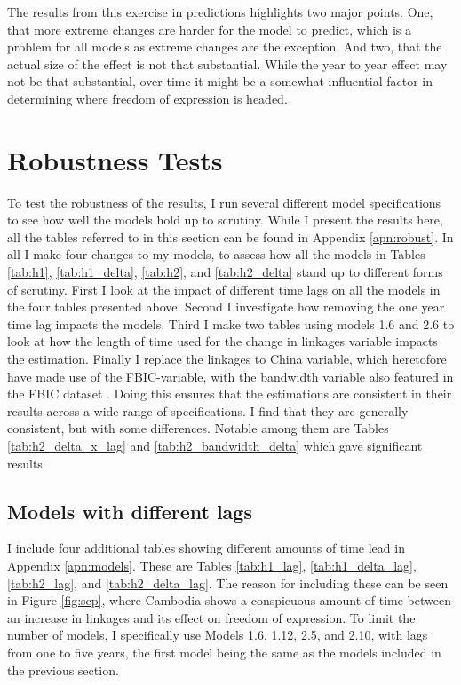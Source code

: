 The results from this exercise in predictions highlights two major points. One, that more extreme changes are harder for the model to predict, which is a problem for all models as extreme changes are the exception. And two, that the actual size of the effect is not that substantial. While the year to year effect may not be that substantial, over time it might be a somewhat influential factor in determining where freedom of expression is headed.

\section{Robustness Tests} \label{sec:robust}
To test the robustness of the results, I run several different model specifications to see how well the models hold up to scrutiny. While I present the results here, all the tables referred to in this section can be found in Appendix \ref{apn:robust}. In all I make four changes to my models, to assess how all the models in Tables \ref{tab:h1}, \ref{tab:h1_delta}, \ref{tab:h2}, and \ref{tab:h2_delta} stand up to different forms of scrutiny. First I look at the impact of different time lags on all the models in the four tables presented above. Second I investigate how removing the one year time lag impacts the models. Third I make two tables using models 1.6 and 2.6 to look at how the length of time used for the change in linkages variable impacts the estimation. Finally I replace the linkages to China variable, which heretofore have made use of the FBIC-variable, with the bandwidth variable also featured in the FBIC dataset \citep{moyer_china-us_2021}. Doing this ensures that the estimations are consistent in their results across a wide range of specifications. I find that they are generally consistent, but with some differences. Notable among them are Tables \ref{tab:h2_delta_x_lag} and \ref{tab:h2_bandwidth_delta} which gave significant results.

\subsection{Models with different lags}
I include four additional tables showing different amounts of time lead in Appendix \ref{apn:models}. These are Tables \ref{tab:h1_lag}, \ref{tab:h1_delta_lag}, \ref{tab:h2_lag}, and \ref{tab:h2_delta_lag}. The reason for including these can be seen in Figure \ref{fig:scp}, where Cambodia shows a conspicuous amount of time between an increase in linkages and its effect on freedom of expression. To limit the number of models, I specifically use Models 1.6, 1.12, 2.5, and 2.10, with lags from one to five years, the first model being the same as the models included in the previous section. 

